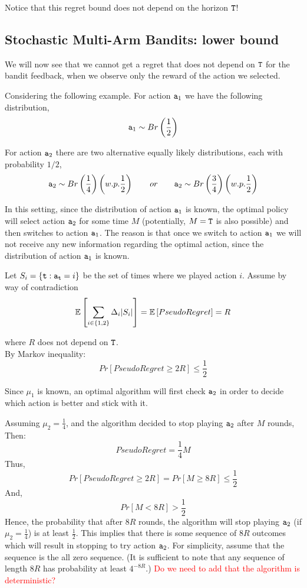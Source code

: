 Notice that this regret bound does not depend on  the horizon ${\tt T}$!

\subsection{Stochastic Multi-Arm Bandits: lower bound}


We will now see that we cannot get a regret that does not depend on ${\tt T}$ for the bandit feedback, when we observe only the reward of the action we selected.

Considering the following example. For action ${\tt a}_1$ we have the following distribution,
\[
{\tt a}_{1}\sim Br\left(\frac{1}{2}\right)\]

For action ${\tt a}_2$ there are two alternative equally likely  distributions, each with probability $1/2$,
\[
{\tt a}_{2}\sim Br\left(\frac{1}{4}\right) \left(w.p. \frac{1}{2}\right)
\qquad or \qquad {\tt a}_{2}\sim Br\left(\frac{3}{4}\right) \left(w.p.
\frac{1}{2}\right)
\]

In this setting, since the distribution of action ${\tt a}_1$ is known, the optimal policy will select action ${\tt a}_2$ for some time $M$ (potentially, $M={\tt T}$ is also possible) and then switches to action ${\tt a}_1$. The reason is that once we switch to action ${\tt a}_1$ we will not receive any new information regarding the optimal action, since the distribution of action ${\tt a}_1$ is known. 

Let $S_i=\{{\tt t}:{\tt a}_{\tt t}=i\}$ be the set of times where we played action $i$. 
Assume by way of contradiction
\[
\mathbb{E}\left[ \sum_{i \in \{1,2\}} \Delta_i |S_i|\right] = \mathbb{E}\left[Pseudo Regret\right]=R
\]

where $R$ does not depend on ${\tt T}$. \\ By Markov inequality:
\[
Pr\left[Pseudo Regret\ge2R\right]\le\frac{1}{2}
\]

Since $\mu_1$ is known, an optimal algorithm will first check ${\tt a}_2$
in order to decide which action is better and stick with it.

Assuming $\mu_2 = \frac{1}{4}$, and the algorithm decided to stop
playing ${\tt a}_2$ after $M$ rounds, Then:
\[
Pseudo Regret = \frac{1}{4}M
\]
Thus,
\[
Pr\left[Pseudo Regret\ge 2R \right] = Pr\left[ M\ge 8R
\right]\le\frac{1}{2}
\]
And,
\[
Pr\left[M < 8R \right]>\frac{1}{2}
\]
Hence, the probability that after $8R$ rounds, the algorithm will
stop playing ${\tt a}_2$ (if $\mu_2 = \frac{1}{4}$) is at least
$\frac{1}{2}$. This implies that there is some sequence of $8R$
outcomes which will result in stopping to try action ${\tt a}_2$. For simplicity, assume that the sequence is the all zero sequence. (It is sufficient to note that any sequence of length $8R$ has probability at least $4^{-8R}$.)
\textcolor{red}{Do we need to add that the algorithm is deterministic?}

